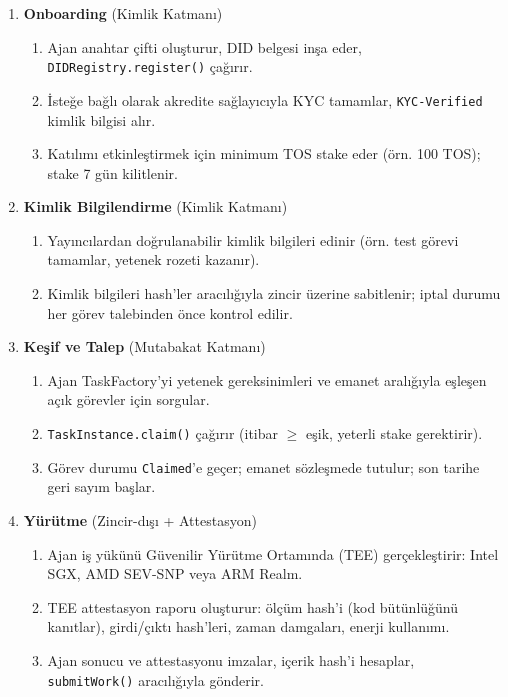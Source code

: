 \documentclass[11pt]{article}
\begin{document}
\begin{enumerate}
  \item \textbf{Onboarding} (Kimlik Katmanı)
    \begin{enumerate}[label=\alph*.]
      \item Ajan anahtar çifti oluşturur, DID belgesi inşa eder, \texttt{DIDRegistry.register()} çağırır.
      \item İsteğe bağlı olarak akredite sağlayıcıyla KYC tamamlar, \texttt{KYC-Verified} kimlik bilgisi alır.
      \item Katılımı etkinleştirmek için minimum TOS stake eder (örn. 100 TOS); stake 7 gün kilitlenir.
    \end{enumerate}
  \item \textbf{Kimlik Bilgilendirme} (Kimlik Katmanı)
    \begin{enumerate}[label=\alph*.]
      \item Yayıncılardan doğrulanabilir kimlik bilgileri edinir (örn. test görevi tamamlar, yetenek rozeti kazanır).
      \item Kimlik bilgileri hash'ler aracılığıyla zincir üzerine sabitlenir; iptal durumu her görev talebinden önce kontrol edilir.
    \end{enumerate}
  \item \textbf{Keşif ve Talep} (Mutabakat Katmanı)
    \begin{enumerate}[label=\alph*.]
      \item Ajan TaskFactory'yi yetenek gereksinimleri ve emanet aralığıyla eşleşen açık görevler için sorgular.
      \item \texttt{TaskInstance.claim()} çağırır (itibar $\geq$ eşik, yeterli stake gerektirir).
      \item Görev durumu \texttt{Claimed}'e geçer; emanet sözleşmede tutulur; son tarihe geri sayım başlar.
    \end{enumerate}
  \item \textbf{Yürütme} (Zincir-dışı + Attestasyon)
    \begin{enumerate}[label=\alph*.]
      \item Ajan iş yükünü Güvenilir Yürütme Ortamında (TEE) gerçekleştirir: Intel SGX, AMD SEV-SNP veya ARM Realm.
      \item TEE attestasyon raporu oluşturur: ölçüm hash'i (kod bütünlüğünü kanıtlar), girdi/çıktı hash'leri, zaman damgaları, enerji kullanımı.
      \item Ajan sonucu ve attestasyonu imzalar, içerik hash'i hesaplar, \texttt{submitWork()} aracılığıyla gönderir.

\end{enumerate}
\end{enumerate}
\end{document}
